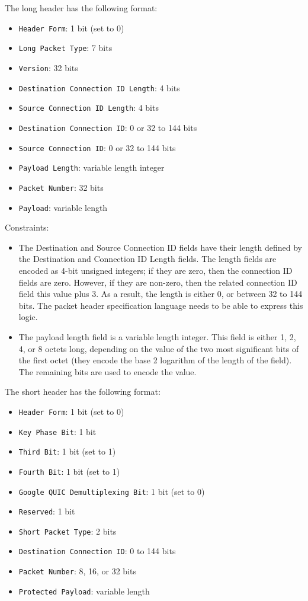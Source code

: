 \documentclass[10pt,a4paper]{article}
\begin{document}
The long header has the following format:
\begin{itemize}
\item \texttt{Header Form}: 1 bit (set to 0)
\item \texttt{Long Packet Type}: 7 bits
\item \texttt{Version}: 32 bits
\item \texttt{Destination Connection ID Length}: 4 bits
\item \texttt{Source Connection ID Length}: 4 bits
\item \texttt{Destination Connection ID}: 0 or 32 to 144 bits
\item \texttt{Source Connection ID}: 0 or 32 to 144 bits
\item \texttt{Payload Length}: variable length integer
\item \texttt{Packet Number}: 32 bits
\item \texttt{Payload}: variable length
\end{itemize}

Constraints:
\begin{itemize}
\item The Destination and Source Connection ID fields have their length defined by the
Destination and Connection ID Length fields. The length fields are encoded as 4-bit
unsigned integers; if they are zero, then the connection ID fields are zero. However, if
they are non-zero, then the related connection ID field this value plus 3. As a result,
the length is either 0, or between 32 to 144 bits. The packet header specification
language needs to be able to express this logic.
\item The payload length field is a variable length integer. This field is either 1, 2,
4, or 8 octets long, depending on the value of the two most significant bits of the first
octet (they encode the base 2 logarithm of the length of the field). The remaining bits
are used to encode the value.
\end{itemize}

The short header has the following format:
\begin{itemize}
\item \texttt{Header Form}: 1 bit (set to 0)
\item \texttt{Key Phase Bit}: 1 bit
\item \texttt{Third Bit}: 1 bit (set to 1)
\item \texttt{Fourth Bit}: 1 bit (set to 1)
\item \texttt{Google QUIC Demultiplexing Bit}: 1 bit (set to 0)
\item \texttt{Reserved}: 1 bit
\item \texttt{Short Packet Type}: 2 bits
\item \texttt{Destination Connection ID}: 0 to 144 bits
\item \texttt{Packet Number}: 8, 16, or 32 bits
\item \texttt{Protected Payload}: variable length
\end{itemize}
\end{document}
